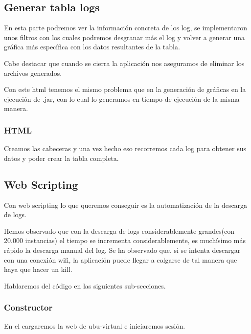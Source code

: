 \subsection{Generar tabla logs}\label{generar-tabla-log}
 
 En esta parte podremos ver la información concreta de los log, se implementaron unos filtros con los cuales podremos desgranar más el log y volver a generar una gráfica más específica con los datos resultantes de la tabla.
 
 Cabe destacar que cuando se cierra la aplicación nos aseguramos de eliminar los archivos generados.
 
 Con este html tenemos el mismo problema que en la generación de gráficas en la ejecución de .jar, con lo cual lo generamos en tiempo de ejecución de la misma manera.
 
\subsubsection{HTML}\label{html-tabla-log}
 

Creamos las cabeceras y una vez hecho eso recorremos cada log para obtener sus datos y poder crear la tabla completa.

\subsection{Web Scripting}\label{web-scripting}

Con web scripting lo que queremos conseguir es la automatización de la descarga de logs.

Hemos observado que con la descarga de logs considerablemente grandes(con 20.000 instancias) el tiempo se incrementa considerablemente, es muchísimo más rápido la descarga manual del log. Se ha observado que, si se intenta descargar con una conexión wifi, la aplicación puede llegar a colgarse de tal manera que haya que hacer un kill.

Hablaremos del código en las siguientes sub-secciones.

\subsubsection{Constructor}\label{constructor}

En el cargaremos la web de ubu-virtual e iniciaremos sesión.


